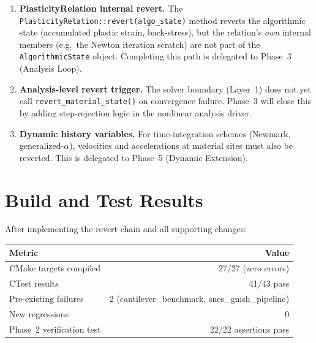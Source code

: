 \begin{enumerate}
  \item \textbf{PlasticityRelation internal revert.}
        The \texttt{PlasticityRelation::revert(algo\_state)} method
        reverts the algorithmic state (accumulated plastic strain,
        back-stress), but the relation's \emph{own} internal members
        (e.g.\ the Newton iteration scratch) are not part of the
        \texttt{AlgorithmicState} object.  Completing this path is
        delegated to Phase~3 (Analysis Loop).

  \item \textbf{Analysis-level revert trigger.}
        The solver boundary (Layer~1) does not yet call
        \texttt{revert\_material\_state()} on convergence failure.
        Phase~3 will close this by adding step-rejection logic in the
        nonlinear analysis driver.

  \item \textbf{Dynamic history variables.}
        For time-integration schemes (Newmark, generalized-$\alpha$),
        velocities and accelerations at material sites must also be
        reverted.  This is delegated to Phase~5 (Dynamic Extension).
\end{enumerate}

\section{Build and Test Results}
\label{sec:phase2-build-results}

After implementing the revert chain and all supporting changes:

\begin{center}
\begin{tabular}{lr}
\toprule
\textbf{Metric} & \textbf{Value} \\
\midrule
CMake targets compiled    & 27/27 (zero errors) \\
CTest results             & 41/43 pass \\
Pre-existing failures     & 2 (cantilever\_benchmark, snes\_gmsh\_pipeline) \\
New regressions           & 0 \\
Phase~2 verification test & 22/22 assertions pass \\
\bottomrule
\end{tabular}
\end{center}

